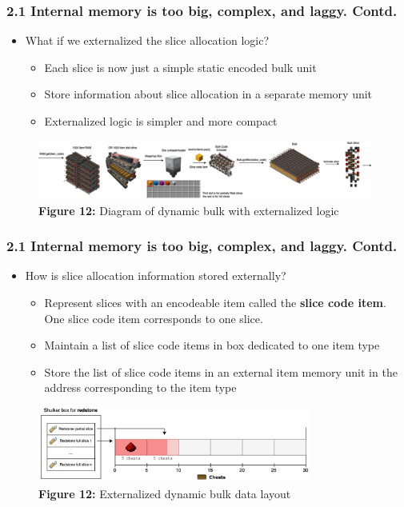 \documentclass[aspectratio=169]{beamer}
\begin{document}
\begin{frame}
	\frametitle{2.1 Internal memory is too big, complex, and laggy. Contd.}

    \begin{itemize}
		\item What if we externalized the slice allocation logic?
        \begin{itemize}
        \item Each slice is now just a simple static encoded bulk unit
        \item Store information about slice allocation in a separate memory unit
        \item Externalized logic is simpler and more compact
        \end{itemize}
	\end{itemize}
    \begin{figure}
        \includegraphics[width=0.98\textwidth]{dynamicbulk2.png}
        \caption{\textbf{Figure 12:} Diagram of dynamic bulk with externalized logic}
	
    \end{figure}

\end{frame}


\begin{frame}
	\frametitle{2.1 Internal memory is too big, complex, and laggy. Contd.}

    \begin{itemize}
		\item How is slice allocation information stored externally?
        \begin{itemize}
        \item Represent slices with an encodeable item called the \textbf{slice code item}. One slice code item corresponds to one slice.
        \item Maintain a list of slice code items in box dedicated to one item type
        \item Store the list of slice code items in an external item memory unit in the address corresponding to the item type
        \end{itemize}
	\end{itemize}
    \begin{figure}
        \includegraphics[width=0.8\textwidth]{externallayout.png}
        \caption{\textbf{Figure 12:} Externalized dynamic bulk data layout}
	
    \end{figure}

\end{frame}
\end{document}
